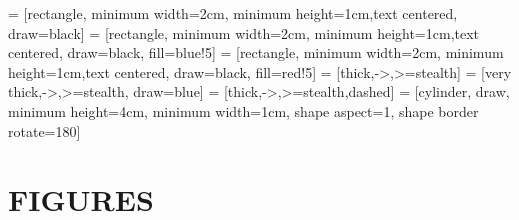  = [rectangle, minimum width=2cm, minimum height=1cm,text centered, draw=black]
 = [rectangle, minimum width=2cm, minimum height=1cm,text centered, draw=black, fill=blue!5]
 = [rectangle, minimum width=2cm, minimum height=1cm,text centered, draw=black, fill=red!5]
 = [thick,->,>=stealth]
 = [very thick,->,>=stealth, draw=blue]
 = [thick,->,>=stealth,dashed]
 = [cylinder, draw, minimum height=4cm, minimum width=1cm, shape aspect=1, shape border rotate=180]
\usetikzlibrary{shapes.geometric, calc}


\newpage
\section*{FIGURES}

